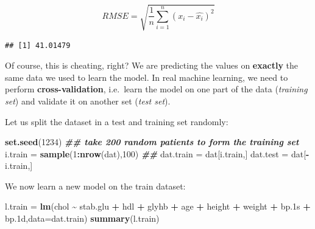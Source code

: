 \documentclass[
]{book}
\newenvironment{Shaded}{\begin{snugshade}}{\end{snugshade}}
\newcommand{\AttributeTok}[1]{\textcolor[rgb]{0.13,0.29,0.53}{#1}}
\newcommand{\DecValTok}[1]{\textcolor[rgb]{0.00,0.00,0.81}{#1}}
\newcommand{\DocumentationTok}[1]{\textcolor[rgb]{0.56,0.35,0.01}{\textbf{\textit{#1}}}}
\newcommand{\FloatTok}[1]{\textcolor[rgb]{0.00,0.00,0.81}{#1}}
\newcommand{\FunctionTok}[1]{\textcolor[rgb]{0.13,0.29,0.53}{\textbf{#1}}}
\newcommand{\NormalTok}[1]{#1}
\newcommand{\OtherTok}[1]{\textcolor[rgb]{0.56,0.35,0.01}{#1}}
\newcommand{\SpecialCharTok}[1]{\textcolor[rgb]{0.81,0.36,0.00}{\textbf{#1}}}
\begin{document}
\[
RMSE = \sqrt{\frac{1}{n}\sum_{i=1}^n (x_i-\hat{x_i})^2}
\]

\begin{Shaded}
\end{Shaded}

\begin{verbatim}
## [1] 41.01479
\end{verbatim}

Of course, this is cheating, right? We are predicting the values on \textbf{exactly} the same data we used to learn the model. In real machine learning, we need to perform \textbf{cross-validation}, i.e.~learn the model on one part of the data (\emph{training set}) and validate it on another set (\emph{test set}).

Let us split the dataset in a test and training set randomly:

\begin{Shaded}
\begin{Highlighting}[]
\FunctionTok{set.seed}\NormalTok{(}\DecValTok{1234}\NormalTok{)}
\DocumentationTok{\#\# take 200 random patients to form the training set}
\NormalTok{i.train }\OtherTok{=} \FunctionTok{sample}\NormalTok{(}\DecValTok{1}\SpecialCharTok{:}\FunctionTok{nrow}\NormalTok{(dat),}\DecValTok{100}\NormalTok{)}
\DocumentationTok{\#\#}
\NormalTok{dat.train }\OtherTok{=}\NormalTok{ dat[i.train,]}
\NormalTok{dat.test }\OtherTok{=}\NormalTok{ dat[}\SpecialCharTok{{-}}\NormalTok{i.train,]}
\end{Highlighting}
\end{Shaded}

We now learn a new model on the train dataset:

\begin{Shaded}
\begin{Highlighting}[]
\NormalTok{l.train }\OtherTok{=} \FunctionTok{lm}\NormalTok{(chol }\SpecialCharTok{\textasciitilde{}}\NormalTok{ stab.glu }\SpecialCharTok{+}\NormalTok{ hdl }\SpecialCharTok{+}\NormalTok{ glyhb }\SpecialCharTok{+}\NormalTok{ age }\SpecialCharTok{+}\NormalTok{ height }\SpecialCharTok{+}\NormalTok{ weight  }\SpecialCharTok{+}\NormalTok{ bp}\FloatTok{.1}\NormalTok{s }\SpecialCharTok{+}\NormalTok{ bp}\FloatTok{.1}\NormalTok{d,}\AttributeTok{data=}\NormalTok{dat.train)}
\FunctionTok{summary}\NormalTok{(l.train)}
\end{Highlighting}
\end{Shaded}
\end{document}
